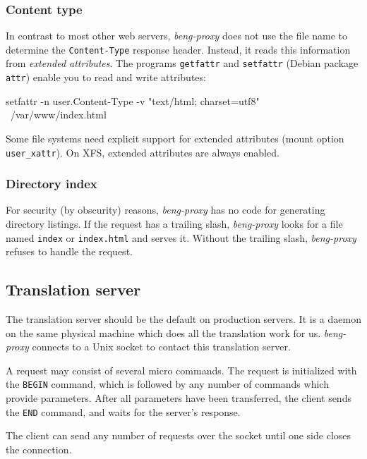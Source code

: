 \documentclass[a4paper,12pt]{article}
\begin{document}
\subsubsection{Content type}
\label{xattr}

In contrast to most other web servers, \emph{beng-proxy} does not use
the file name to determine the \texttt{Content-Type} response header.
Instead, it reads this information from \textit{extended attributes}.
The programs \texttt{getfattr} and \texttt{setfattr} (Debian package
\texttt{attr}) enable you to read and write attributes:

\begin{verbatim*}
setfattr -n user.Content-Type -v "text/html; charset=utf8" \
/var/www/index.html
\end{verbatim*}

Some file systems need explicit support for extended attributes (mount
option \texttt{user\_xattr}).  On
XFS, extended attributes are always enabled.

\subsubsection{Directory index}

For security (by obscurity) reasons, \emph{beng-proxy} has no code for
generating directory listings.  If the request has a trailing slash,
\emph{beng-proxy} looks for a file named \texttt{index} or
\texttt{index.html} and serves it.  Without the trailing slash,
\emph{beng-proxy} refuses to handle the request.


\subsection{Translation server}

The translation server should be the default on production servers.
It is a daemon on the same physical machine which does all the
translation work for us.  \emph{beng-proxy} connects to a Unix socket
to contact this translation server.

A request may consist of several micro commands.  The request is
initialized with the \texttt{BEGIN} command, which is followed by any
number of commands which provide parameters.  After all parameters
have been transferred, the client sends the \texttt{END} command,
and waits for the server's response.

The client can send any number of requests over the socket until one
side closes the connection.
\end{document}

